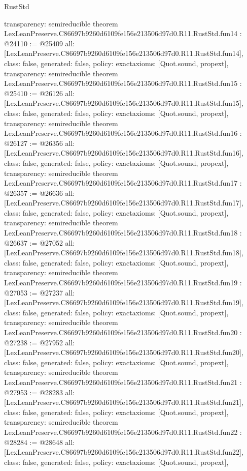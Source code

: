 \begin{lexlean}{RustStd}
\begin{coremodule}
{  transparency: semireducible
}
theorem LexLeanPreserve.C86697b9260d6109fe156e213506d97d0.R11.RustStd.fun14 : @24110 := @25409 {
  all: [LexLeanPreserve.C86697b9260d6109fe156e213506d97d0.R11.RustStd.fun14],
  class: false,
  generated: false,
  policy: exact{axioms: [Quot.sound, propext]},
  transparency: semireducible
}
theorem LexLeanPreserve.C86697b9260d6109fe156e213506d97d0.R11.RustStd.fun15 : @25410 := @26126 {
  all: [LexLeanPreserve.C86697b9260d6109fe156e213506d97d0.R11.RustStd.fun15],
  class: false,
  generated: false,
  policy: exact{axioms: [Quot.sound, propext]},
  transparency: semireducible
}
theorem LexLeanPreserve.C86697b9260d6109fe156e213506d97d0.R11.RustStd.fun16 : @26127 := @26356 {
  all: [LexLeanPreserve.C86697b9260d6109fe156e213506d97d0.R11.RustStd.fun16],
  class: false,
  generated: false,
  policy: exact{axioms: [Quot.sound, propext]},
  transparency: semireducible
}
theorem LexLeanPreserve.C86697b9260d6109fe156e213506d97d0.R11.RustStd.fun17 : @26357 := @26636 {
  all: [LexLeanPreserve.C86697b9260d6109fe156e213506d97d0.R11.RustStd.fun17],
  class: false,
  generated: false,
  policy: exact{axioms: [Quot.sound, propext]},
  transparency: semireducible
}
theorem LexLeanPreserve.C86697b9260d6109fe156e213506d97d0.R11.RustStd.fun18 : @26637 := @27052 {
  all: [LexLeanPreserve.C86697b9260d6109fe156e213506d97d0.R11.RustStd.fun18],
  class: false,
  generated: false,
  policy: exact{axioms: [Quot.sound, propext]},
  transparency: semireducible
}
theorem LexLeanPreserve.C86697b9260d6109fe156e213506d97d0.R11.RustStd.fun19 : @27053 := @27237 {
  all: [LexLeanPreserve.C86697b9260d6109fe156e213506d97d0.R11.RustStd.fun19],
  class: false,
  generated: false,
  policy: exact{axioms: [Quot.sound, propext]},
  transparency: semireducible
}
theorem LexLeanPreserve.C86697b9260d6109fe156e213506d97d0.R11.RustStd.fun20 : @27238 := @27952 {
  all: [LexLeanPreserve.C86697b9260d6109fe156e213506d97d0.R11.RustStd.fun20],
  class: false,
  generated: false,
  policy: exact{axioms: [Quot.sound, propext]},
  transparency: semireducible
}
theorem LexLeanPreserve.C86697b9260d6109fe156e213506d97d0.R11.RustStd.fun21 : @27953 := @28283 {
  all: [LexLeanPreserve.C86697b9260d6109fe156e213506d97d0.R11.RustStd.fun21],
  class: false,
  generated: false,
  policy: exact{axioms: [Quot.sound, propext]},
  transparency: semireducible
}
theorem LexLeanPreserve.C86697b9260d6109fe156e213506d97d0.R11.RustStd.fun22 : @28284 := @28648 {
  all: [LexLeanPreserve.C86697b9260d6109fe156e213506d97d0.R11.RustStd.fun22],
  class: false,
  generated: false,
  policy: exact{axioms: [Quot.sound, propext]},
}
\end{coremodule}
\end{lexlean}
